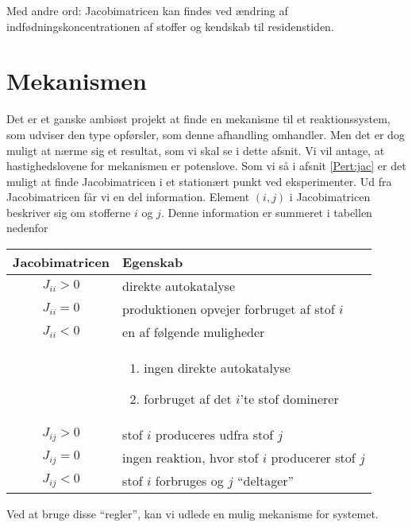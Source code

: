 Med andre ord: Jacobimatricen kan findes ved {\ae}ndring af
ind\-f{\o}d\-nings\-kon\-cen\-tra\-tionen af stoffer og
kendskab til residenstiden.
 
\section{Mekanismen}
Det er et ganske ambi{\o}st projekt at finde en mekanisme
til et reaktionssystem, som udviser den type opf{\o}rsler,
som denne afhandling omhandler. Men det er dog muligt at
n{\ae}rme sig et resultat, som vi skal se i dette afsnit.
Vi vil antage, at hastighedslovene for mekanismen er
potenslove. Som vi s{\aa} i afsnit \ref{Pert:jac} er det
muligt at finde Jacobimatricen i et station{\ae}rt punkt
ved eksperimenter. Ud fra Jacobimatricen f{\aa}r vi en del
information. Element $(i,j)$ i Jacobimatricen beskriver sig
om stofferne $i$ og $j$. Denne information er summeret i
tabellen nedenfor

\vspace{0.15cm}
\begin{tabular}[h]{cl}
Jacobimatricen & Egenskab \\ \hline
$J_{ii} > 0$    & direkte autokatalyse \\
$J_{ii} = 0$    & produktionen opvejer forbruget af stof $i$ \\
$J_{ii} < 0$    & en af f{\o}lgende muligheder \\
                & \begin{minipage}[t]{5cm}
                  \begin{enumerate}
                     \item ingen direk\-te autokatalyse
                     \item forbruget af det $i$'te stof do\-mi\-ne\-rer
                  \end{enumerate} 
                  \end{minipage} \\
$J_{ij} > 0$    & stof $i$ produceres udfra stof $j$ \\
$J_{ij} = 0$    & ingen reaktion, hvor stof $i$ producerer stof $j$ \\
$J_{ij} < 0$    & stof $i$ forbruges og $j$ ``deltager'' \\ \hline
\end{tabular}
\vspace{0.15cm}

Ved at bruge disse ``regler'', kan vi udlede en mulig
mekanisme for systemet.


